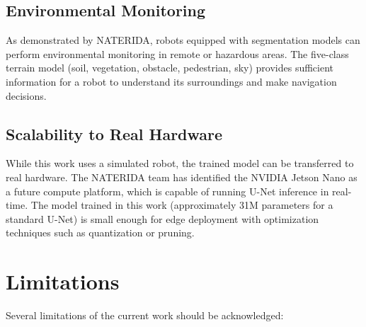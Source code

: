 \documentclass[12pt,a4paper]{article}
\begin{document}
\subsection{Environmental Monitoring}

As demonstrated by NATERIDA, robots equipped with segmentation models can perform environmental monitoring in remote or hazardous areas. The five-class terrain model (soil, vegetation, obstacle, pedestrian, sky) provides sufficient information for a robot to understand its surroundings and make navigation decisions.

\subsection{Scalability to Real Hardware}

While this work uses a simulated robot, the trained model can be transferred to real hardware. The NATERIDA team has identified the NVIDIA Jetson Nano as a future compute platform, which is capable of running U-Net inference in real-time. The model trained in this work (approximately 31M parameters for a standard U-Net) is small enough for edge deployment with optimization techniques such as quantization or pruning.

\section{Limitations}
\label{sec:limitations}

Several limitations of the current work should be acknowledged:
\end{document}
